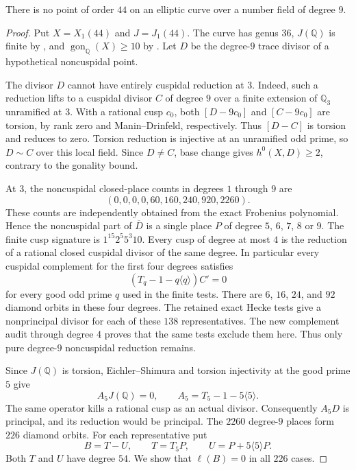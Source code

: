 \begin{proposition}\label{prop:nonic-no44}
There is no point of order $44$ on an elliptic curve over a number
field of degree $9$.
\end{proposition}
\begin{proof}
Put $X=X_1(44)$ and $J=J_1(44)$. The curve has genus $36$,
$J(\mathbb Q)$ is finite by \cite{DEHMZ}, and
$\operatorname{gon}_{\mathbb Q}(X)\geq10$ by
\cite[Table~1]{NV}. Let $D$ be the degree-$9$ trace divisor of a
hypothetical noncuspidal point.

The divisor $D$ cannot have entirely cuspidal reduction at $3$.
Indeed, such a reduction lifts to a cuspidal divisor $C$ of degree
$9$ over a finite extension of $\mathbb Q_3$ unramified at $3$.
With a rational cusp $c_0$, both $[D-9c_0]$ and $[C-9c_0]$ are
torsion, by rank zero and Manin--Drinfeld, respectively.
Thus $[D-C]$ is torsion and reduces to zero. Torsion reduction is
injective at an unramified odd prime, so $D\sim C$ over this local
field. Since $D\ne C$, base change gives $h^0(X,D)\geq2$, contrary
to the gonality bound.

At $3$, the noncuspidal closed-place counts in degrees $1$ through
$9$ are
\[
 (0,0,0,0,60,160,240,920,2260).
\]
These counts are independently obtained from the exact Frobenius
polynomial. Hence the noncuspidal part of $\overline D$ is a single
place $P$ of degree $5$, $6$, $7$, $8$ or $9$.
The finite cusp signature is $1^{15}2^5 5^3 10$.
Every cusp of degree at most $4$ is the reduction of a rational
closed cuspidal divisor of the same degree. In particular every
cuspidal complement for the first four degrees satisfies
\[
 (T_q-1-q\langle q\rangle)C'=0
\]
for every good odd prime $q$ used in the finite tests.
There are $6$, $16$, $24$, and $92$ diamond orbits in these four
degrees. The retained exact Hecke tests give a nonprincipal divisor
for each of these $138$ representatives. The new complement audit
through degree $4$ proves that the same tests exclude them here.
Thus only pure degree-$9$ noncuspidal reduction remains.

Since $J(\mathbb Q)$ is torsion, Eichler--Shimura and torsion
injectivity at the good prime $5$ give
\[
 A_5J(\mathbb Q)=0,\qquad A_5=T_5-1-5\langle5\rangle.
\]
The same operator kills a rational cusp as an actual divisor.
Consequently $A_5D$ is principal, and its reduction would be
principal. The $2260$ degree-$9$ places form $226$ diamond orbits.
For each representative put
\[
 B=T-U,\qquad T=T_5P,\qquad U=P+5\langle5\rangle P.
\]
Both $T$ and $U$ have degree $54$. We show that $\ell(B)=0$ in
all $226$ cases.


\end{proof}
